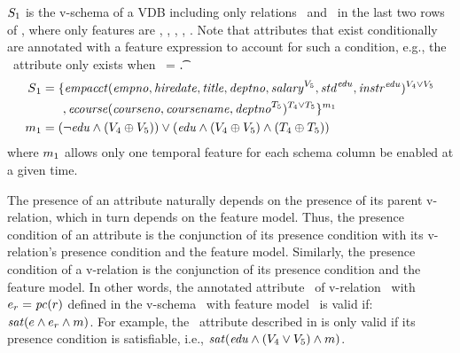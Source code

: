 \begin{example}
\label{eg:vsch}
$\vSch_1$ is the v-schema of a VDB including only relations \empacct\ and \ecourse\ in the last two rows
of , where only features are \vFour, \vFive, \edu, \tFour, \tFive.
Note that attributes that exist conditionally are annotated with a feature expression
to account for such a condition, e.g., the \salary\ attribute only exists when \vFive\ = \t.
%
\begin{align*}
\vSch_1 &=
\{ \empacct ( \empno, \hiredate, \titleatt, \deptno, \annot [\vFive] \salary, 
 \annot [\edu] \isstudent,
\annot [\edu] \isteacher )^{\vFour \vee \vFive}\\
%
&\hspace{17pt} ,\ecourse ( \cno, \cname, \annot [\tFive] \deptno )^{\tFour \vee \tFive} \}^{\fModel_1}\\
\fModel_1 &= 
\paran {\neg \edu \wedge \paran {\vFour \oplus \vFive}
 }
\vee
\paran {\edu \wedge \paran {\vFour \oplus \vFive}
\wedge
\paran {\tFour \oplus \tFive}
}
\end{align*}
where \ensuremath{\fModel_1} allows only one temporal feature for each schema column 
be enabled at a given time.
\end{example}

%

The presence of an attribute naturally depends on the presence of its parent v-relation, which in turn depends on the feature model.
%
Thus, the presence condition of an attribute is  
the conjunction of its presence condition with its v-relation's presence condition
and the feature model.
%
Similarly,
the presence condition of a v-relation is the conjunction of its
presence condition and the feature model.
%
In other words, the annotated attribute \optAtt\ of v-relation \vRel\ with 
$\dimMeta_r = \getPC \vRel$
defined in the v-schema \vSch\ with feature model \fModel\
is valid if: $\sat {\dimMeta \wedge \dimMeta_r \wedge \fModel }$.
For example, the \isstudent\ attribute described in \exref{vsch} 
is only valid if its presence condition is
satisfiable, i.e.,
\ensuremath {\sat {\edu \wedge (\vFour \vee \vFive) \wedge \fModel }}.

